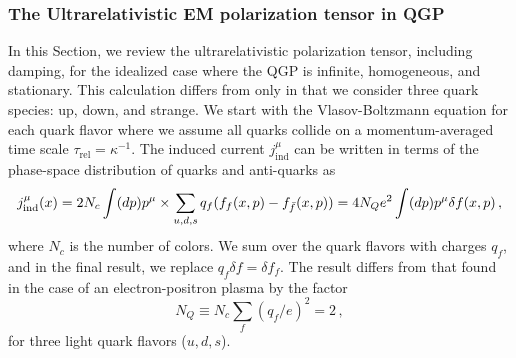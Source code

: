 \subsubsection{The Ultrarelativistic EM polarization tensor in QGP}\label{sec:linresp}

In this Section, we review the ultrarelativistic polarization tensor, including damping, for the idealized case where the QGP is infinite, homogeneous, and stationary. This calculation differs from \cite{Formanek:2021blc} only in that we consider three quark species: up, down, and strange. We start with the Vlasov-Boltzmann equation for each quark flavor  where we assume all quarks collide on a momentum-averaged time scale $\tau_{\text{rel}} = \kappa^{-1}$. The induced current $ j_{\mathrm{ind}}^\mu$ can be written in terms of the phase-space distribution of quarks and anti-quarks as
\begin{equation}\label{eq:current}
   j_{\mathrm{ind}}^\mu(x) = 2 N_c \int (dp)p^\mu \\ \times \sum_{u,d,s} q_f (f_{f}(x,p) - f_{\bar{f}}(x,p))=  4 N_Q e^2 \int (dp)p^\mu \delta f(x,p)\,,
\end{equation}
where  $N_c$ is the number of colors. We sum over the quark flavors with charges $q_f$, and in the final result, we replace $q_f \delta f = \delta f_f$. The result  differs from that found in the case of an electron-positron plasma by the factor
\begin{equation}
N_Q \equiv N_c\sum_f (q_f/e)^2 = 2\,,
\end{equation}
for three light quark flavors ($u,d,s$).

